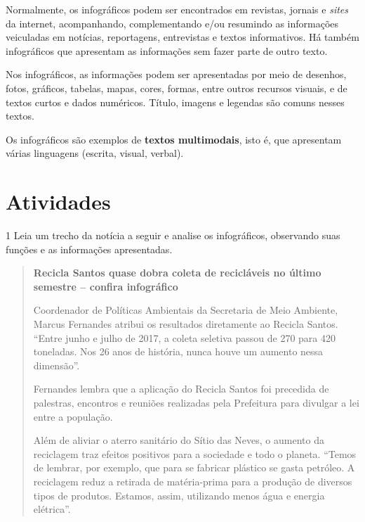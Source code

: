 \begin{conteudo}
\begin{conteudo}
\begin{conteudo}
\begin{conteudo}
{Normalmente, os infográficos podem ser encontrados em revistas, jornais
e \emph{sites} da internet, acompanhando, complementando e/ou resumindo
as informações veiculadas em notícias, reportagens, entrevistas e textos
informativos. Há também infográficos que apresentam as informações sem
fazer parte de outro texto.

Nos infográficos, as informações podem ser apresentadas por meio de
desenhos, fotos, gráficos, tabelas, mapas, cores, formas, entre outros
recursos visuais, e de textos curtos e dados numéricos. Título, imagens 
e legendas são comuns nesses textos.

Os infográficos são exemplos de \textbf{textos multimodais}, isto é,
que apresentam várias linguagens (escrita, visual, verbal).
}

\section{Atividades}


\num{1} Leia um trecho da notícia a seguir e analise os infográficos,
observando suas funções e as informações apresentadas.

\begin{quote}
\textbf{Recicla Santos quase dobra coleta de recicláveis no último
semestre -- confira infográfico}


Coordenador de Políticas Ambientais da Secretaria de Meio Ambiente,
Marcus Fernandes atribui os resultados diretamente ao Recicla Santos.
``Entre junho e julho de 2017, a coleta seletiva passou de 270 para 420
toneladas. Nos 26 anos de história, nunca houve um aumento nessa
dimensão''.

Fernandes lembra que a aplicação do Recicla Santos foi precedida de
palestras, encontros e reuniões realizadas pela Prefeitura para divulgar
a lei entre a população.

Além de aliviar o aterro sanitário do Sítio das Neves, o aumento da
reciclagem traz efeitos positivos para a sociedade e todo o planeta.
``Temos de lembrar, por exemplo, que para se fabricar plástico se gasta
petróleo. A reciclagem reduz a retirada de matéria-prima para a produção
de diversos tipos de produtos. Estamos, assim, utilizando menos água e
energia elétrica''.


\end{quote}
\end{conteudo}
\end{conteudo}
\end{conteudo}
\end{conteudo}
